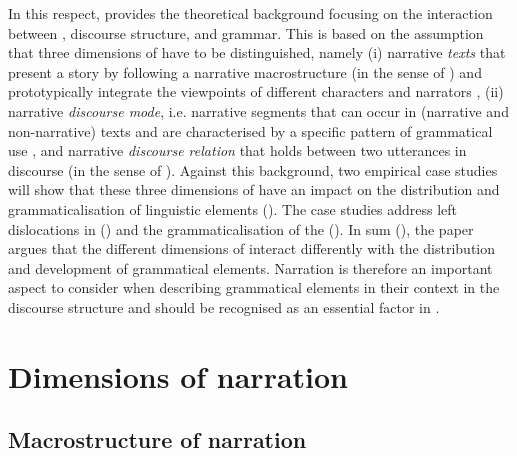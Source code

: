 \documentclass[output=paper,colorlinks,citecolor=brown]{langscibook}
\begin{document}
In this respect,  provides the theoretical background focusing on the interaction between , discourse structure, and grammar. This is based on the assumption that three dimensions of  have to be distinguished, namely (i) narrative \textit{texts} that present a story by following a narrative macrostructure (in the sense of \citealt{LabovWaletzky1967}) and prototypically integrate the viewpoints of different characters and narrators \citep{Zeman2020}, (ii) narrative \textit{discourse mode}, i.e. narrative segments that can occur in (narrative and non-narrative) texts and are characterised by a specific pattern of grammatical use \citep{Smith2003}, and narrative \textit{discourse relation} that holds between two utterances in discourse (in the sense of \citealt{AsherLascarides2003}). Against this background, two empirical case studies will show that these three dimensions of  have an impact on the distribution and grammaticalisation of linguistic elements (). The case studies address left dislocations in  () and the grammaticalisation of the  (). In sum (), the paper argues that the different dimensions of  interact differently with the distribution and development of grammatical elements. Narration is therefore an important aspect to consider when describing grammatical elements in their context in the discourse structure and should be recognised as an essential factor in .


\section{Dimensions of narration} \label{sec:zeman:2}
\subsection{Macrostructure of narration}\label{sec:zeman:2.1}
\end{document}
